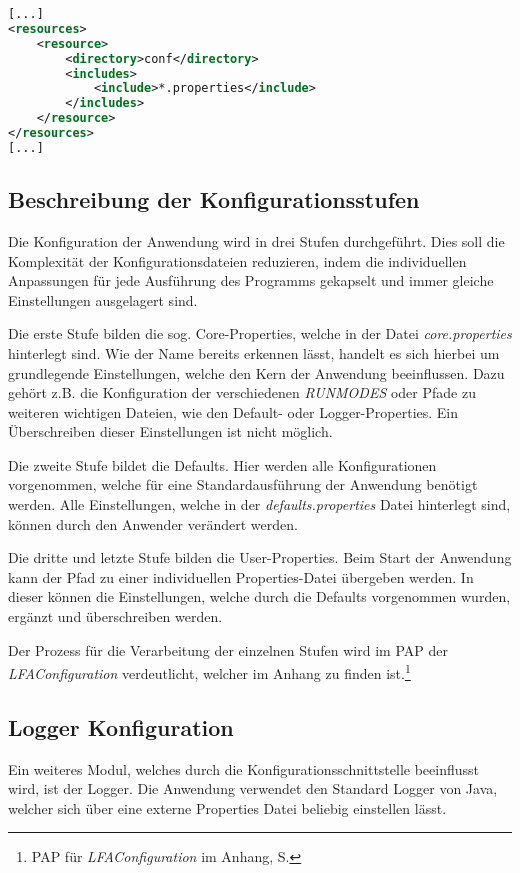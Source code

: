 \begin{lstlisting}[language=XML,caption=pom.xml Ergänzung für Konfigurationsdateien,label=lis:POMErgänzung]
[...]
<resources>
	<resource>
		<directory>conf</directory>
		<includes>
			<include>*.properties</include>
		</includes>
	</resource>
</resources>
[...]
\end{lstlisting}

\subsection{Beschreibung der Konfigurationsstufen}
Die Konfiguration der Anwendung wird in drei Stufen durchgeführt. Dies soll die Komplexität der Konfigurationsdateien reduzieren, indem die individuellen Anpassungen für jede Ausführung des Programms gekapselt und immer gleiche Einstellungen ausgelagert sind.

Die erste Stufe bilden die sog. Core-Properties, welche in der Datei \textit{core.properties} hinterlegt sind. Wie der Name bereits erkennen lässt, handelt es sich hierbei um grundlegende Einstellungen, welche den Kern der Anwendung beeinflussen. Dazu gehört z.B. die Konfiguration der verschiedenen \textit{RUNMODES} oder Pfade zu weiteren wichtigen Dateien, wie den Default- oder Logger-Properties. Ein Überschreiben dieser Einstellungen ist nicht möglich.

Die zweite Stufe bildet die Defaults. Hier werden alle Konfigurationen vorgenommen, welche für eine Standardausführung der Anwendung benötigt werden. Alle Einstellungen, welche in der \textit{defaults.properties} Datei hinterlegt sind, können durch den Anwender verändert werden.

Die dritte und letzte Stufe bilden die User-Properties. Beim Start der Anwendung kann der Pfad zu einer individuellen Properties-Datei übergeben werden. In dieser können die Einstellungen, welche durch die Defaults vorgenommen wurden, ergänzt und  überschreiben werden.

Der Prozess für die Verarbeitung der einzelnen Stufen wird im \ac{PAP} der \textit{LFAConfiguration} verdeutlicht, welcher im Anhang zu finden ist.\footnote{\ac{PAP} für \textit{LFAConfiguration} im Anhang, S. \pageref{subsec:PAPLFAConfiguration}}


\subsection{Logger Konfiguration}
Ein weiteres Modul, welches durch die Konfigurationsschnittstelle beeinflusst wird, ist der Logger. Die Anwendung verwendet den Standard Logger von Java, welcher sich über eine externe Properties Datei beliebig einstellen lässt.


